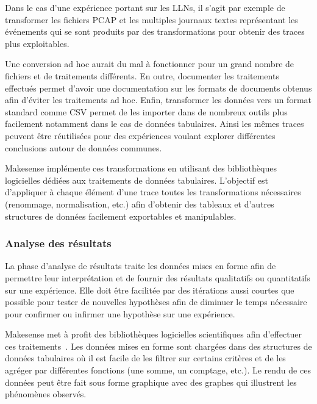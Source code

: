 Dans le cas d'une expérience portant sur les \ac{LLN}s, il s'agit par exemple de transformer les fichiers \ac{PCAP} et les multiples journaux textes représentant les événements qui se sont produits par des transformations pour obtenir des traces plus exploitables.

Une conversion ad hoc aurait du mal à fonctionner pour un grand nombre de fichiers et de traitements différents.
En outre, documenter les traitements effectués permet d'avoir une documentation sur les formats de documents obtenus afin d'éviter les traitements ad hoc.
Enfin, transformer les données vers un format standard comme \ac{CSV} permet de les importer dans de nombreux outils plus facilement notamment dans le cas de données tabulaires.
Ainsi les mêmes traces peuvent être réutilisées pour des expériences voulant explorer différentes conclusions autour de données communes.

Makesense implémente ces transformations en utilisant des bibliothèques logicielles dédiées aux traitements de données tabulaires.
L'objectif est d'appliquer à chaque élément d'une trace toutes les transformations nécessaires (renommage, normalisation, etc.) afin d'obtenir des tableaux et d'autres structures de données facilement exportables et manipulables.

\subsubsection{Analyse des résultats}

La phase d'analyse de résultats traite les données mises en forme afin de permettre leur interprétation et de fournir des résultats qualitatifs ou quantitatifs sur une expérience.
Elle doit être facilitée par des itérations aussi courtes que possible pour tester de nouvelles hypothèses afin de diminuer le temps nécessaire pour confirmer ou infirmer une hypothèse sur une expérience.

Makesense met à profit des bibliothèques logicielles scientifiques afin d'effectuer ces traitements~\cite{mckinney2012python}.
Les données mises en forme sont chargées dans des structures de données tabulaires où il est facile de les filtrer sur certains critères et de les agréger par différentes fonctions (une somme, un comptage, etc.).
Le rendu de ces données peut être fait sous forme graphique avec des graphes qui illustrent les phénomènes observés.

